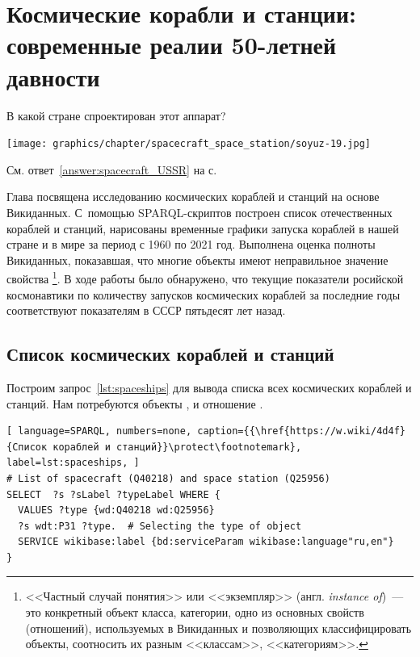 \chapter{Космические корабли и станции: современные реалии 50-летней давности}
\label{ch:spacecraft-space-station}

\begin{marginfigure}[16\baselineskip]
    \MarginQuestion
    В какой стране спроектирован этот аппарат?

    \vspace{3pt}
	\texttt{[image: graphics/chapter/spacecraft\_space\_station/soyuz-19.jpg]}

    См. ответ~\ref{answer:spacecraft_USSR} на с.~\pageref{answer:spacecraft_USSR}\\
    \label{question:spacecraft_soyuz19}
\end{marginfigure}

Глава посвящена исследованию космических кораблей и станций на основе Викиданных. 
С~помощью SPARQL-скриптов построен список отечественных кораблей и станций, 
нарисованы временные графики запуска кораблей в нашей стране и в мире за период с 1960 по 2021 год. 
Выполнена оценка полноты Викиданных, показавшая, 
что многие объекты имеют неправильное значение свойства \footnote{%
    <<Частный случай понятия>> или <<экземпляр>> 
    (англ. \emph{instance of})~--- это конкретный объект класса, категории, 
    одно из основных свойств (отношений), используемых в Викиданных и позволяющих классифицировать объекты, 
    соотносить их разным <<классам>>, <<категориям>>.%
}. 
В ходе работы было обнаружено, что текущие показатели росийской космонавтики по количеству запусков космических кораблей за последние годы соответствуют показателям в СССР пятьдесят лет назад. 



\section{Список космических кораблей и станций}

Построим запрос~\ref{lst:spaceships} для вывода списка всех космических кораблей и станций. 
Нам потребуются объекты , 
 и отношение . 

\begin{lstlisting}[ language=SPARQL, numbers=none, caption={{\href{https://w.wiki/4d4f}{Список кораблей и станций}}\protect\footnotemark}, label=lst:spaceships, ]
# List of spacecraft (Q40218) and space station (Q25956)
SELECT  ?s ?sLabel ?typeLabel WHERE {
  VALUES ?type {wd:Q40218 wd:Q25956}
  ?s wdt:P31 ?type.  # Selecting the type of object
  SERVICE wikibase:label {bd:serviceParam wikibase:language"ru,en"}
}
\end{lstlisting}



